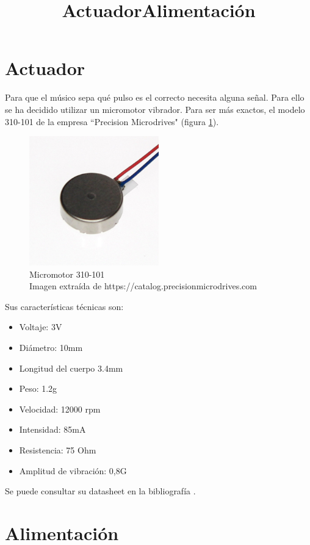 \section{Actuador}
\title{Actuador}
Para que el músico sepa qué pulso es el correcto necesita alguna señal. Para ello
se ha decidido utilizar un micromotor vibrador. Para ser más exactos, el modelo 310-101 de la empresa
``Precision Microdrives" (figura \ref{fig:micromotor}).\\

\begin{figure}[!htb]
\centering
\captionsetup{justification=centering}
\includegraphics[width=0.5\textwidth]{./imagenes/micromotor}
\caption{Micromotor 310-101\\
\scriptsize{Imagen extraída de https://catalog.precisionmicrodrives.com}} \label{fig:micromotor}
\end{figure}


Sus características técnicas son:

\begin{itemize}
  \item Voltaje: 3V
  \item Diámetro: 10mm
  \item Longitud del cuerpo 3.4mm
  \item Peso: 1.2g
  \item Velocidad: 12000 rpm
  \item Intensidad: 85mA
  \item Resistencia: 75 Ohm
  \item Amplitud de vibración: 0,8G
\end{itemize}

Se puede consultar su datasheet en la bibliografía \cite{micromotorData}.



\section{Alimentación}
\title{Alimentación}

